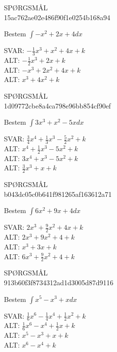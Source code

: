 \documentclass[]{article}
\newcounter{spgcounter}
\newenvironment{question}[2]{\addtocounter{spgcounter}{1} SPØRGSMÅL \thespgcounter\\}{\hspace{50px}}
\newcommand{\answer}[1]{{\color{green} SVAR: #1}\\}
\newcommand{\alt}[1]{{\color{red} ALT: #1}\\}
\begin{document}
\begin{question}{multi}\id{15ac762ae02e486f90f1e0254b168a94}

Bestem $\int{-x^2 + 2x + 4} dx$

\answer{$-\frac{1}{3}x^3 + x^2 + 4x + k$}
\alt{$-\frac{1}{2}x^3 + 2x + k$}
\alt{$-x^3 + 2x^2 + 4x + k$}
\alt{$x^3 + 4x^2 + k$}

\end{question}

\begin{question}{multi}\id{1d09772cbe8a4ca798e96bb854cf90ef}

Bestem $\int{3x^3 + x^2 - 5x} dx$

\answer{$\frac{3}{4}x^4 + \frac{1}{3}x^3 - \frac{5}{2}x^2 + k$}
\alt{$x^4 + \frac{1}{2}x^3 - 5x^2 + k$}
\alt{$3x^4 + x^3 - 5x^2 + k$}
\alt{$\frac{3}{2}x^3 + x + k$}

\end{question}

\begin{question}{multi}\id{b043dc05c0b641f981265af163612a71}

Bestem $\int{6x^2 + 9x + 4} dx$

\answer{$2x^3 + \frac{9}{2}x^2 + 4x + k$}
\alt{$2x^3 + 9x^2 + 4 + k$}
\alt{$x^3 + 3x + k$}
\alt{$6x^3 + \frac{9}{2}x^2 + 4 + k$}

\end{question}

\begin{question}{multi}\id{913b60f3f8734312ad1d3005d87d9116}

Bestem $\int{x^5 - x^3 + x} dx$

\answer{$\frac{1}{6}x^6 - \frac{1}{4}x^4 + \frac{1}{2}x^2 + k$}
\alt{$\frac{1}{6}x^6 - x^4 + \frac{1}{2}x + k$}
\alt{$x^5 - x^3 + x + k$}
\alt{$x^6 - x^4 + k$}

\end{question}
\end{document}
